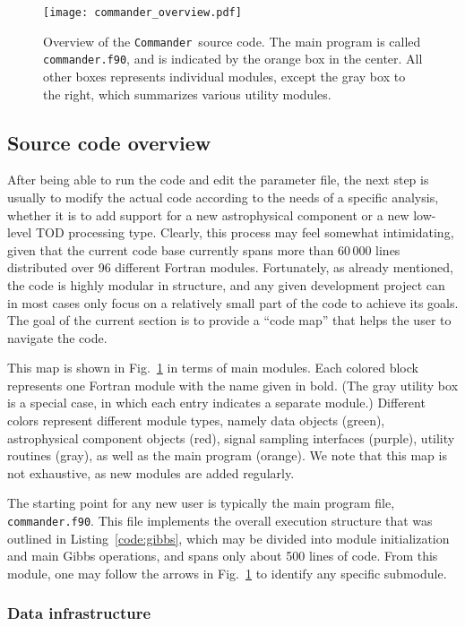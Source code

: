 \documentclass[twocolumn]{aa}
\def\commander{\texttt{Commander}}
\begin{document}
\begin{figure}[t]
  \center
  \texttt{[image: commander\_overview.pdf]}
  \caption{Overview of the \commander\ source code. The main program
    is called \texttt{commander.f90}, and is indicated by the orange
    box in the center. All other boxes represents individual modules,
    except the gray box to the right, which summarizes various utility modules.
  }\label{fig:commander}
\end{figure}

\subsection{Source code overview}

After being able to run the code and edit the parameter file, the next
step is usually to modify the actual code according to the needs of a
specific analysis, whether it is to add support for a new
astrophysical component or a new low-level TOD processing
type. Clearly, this process may feel somewhat intimidating, given that
the current code base currently spans more than 60\,000 lines
distributed over 96 different Fortran modules. Fortunately, as already
mentioned, the code is highly modular in structure, and any given
development project can in most cases only focus on a relatively small
part of the code to achieve its goals. The goal of the current section
is to provide a ``code map'' that helps the user to navigate the code.

This map is shown in Fig.~\ref{fig:commander} in terms of main
modules. Each colored block represents one Fortran module with the
name given in bold. (The gray utility box is a special case, in which
each entry indicates a separate module.) Different colors represent
different module types, namely data objects (green), astrophysical
component objects (red), signal sampling interfaces (purple), utility
routines (gray), as well as the main program (orange). We note that
this map is not exhaustive, as new modules are added regularly.

The starting point for any new user is typically the main program
file, \texttt{commander.f90}. This file implements the overall
execution structure that was outlined in Listing~\ref{code:gibbs}, which
may be divided into module initialization and main Gibbs operations,
and spans only about 500 lines of code. From this module, one may
follow the arrows in Fig.~\ref{fig:commander} to identify any specific
submodule.

\subsubsection{Data infrastructure}
\end{document}
